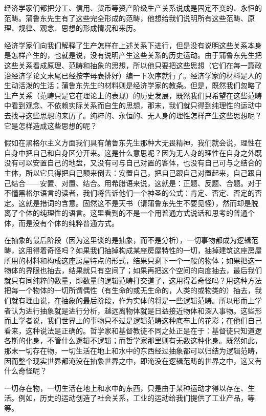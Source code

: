 \documentclass[a4paper,twoside,12pt]{ctexart}
\begin{document}
经济学家们都把分工、信用、货币等资产阶级生产关系说成是固定不变的、永恒的范畴。蒲鲁东先生有了这些完全形成的范畴，他想给我们说明所有这些范畴、原理、规律、观念、思想的形成情况和来历。

经济学家们向我们解释了生产怎样在上述关系下进行，但是没有说明这些关系本身是怎样产生的，也就是说，没有说明产生这些关系的历史运动。由于蒲鲁东先生把这些关系看成原理、范畴和抽象的思想，所以他只要把这些思想（它们在每一篇政治经济学论文末尾已经按字母表排好）编一下次序就行了。经济学家的材料是人的生动活泼的生活；蒲鲁东先生的材料则是经济学家的教条。但是，既然我们忽略了生产关系（范畴只是它在理论上的表现）的历史发展，既然我们只希望在这些范畴中看到观念、不依赖实际关系而自生的思想，那末，我们就只得到纯理性的运动中去找寻这些思想的来历了。纯粹的、永恒的、无人身的理性怎样产生这些思想呢？它是怎样造成这些思想的呢？

假如在黑格尔主义方面我们具有蒲鲁东先生那种大无畏精神，我们就会说，理性在自身中把自己和自身区分开来。这是什么意思呢？因为无人身的理性在自身之外既没有可以安置自己的地盘，又没有可与自己对置的客体，也没有自己可与之结合的主体，所以它只得把自己颠来倒去：安置自己，把自己跟自己对置起来，自己跟自己结合——安置、对置、结合。用希腊语来说，这就是：正题、反题、合题。对于不懂黑格尔语言的读者，我们将告诉他们一个神圣的公式：肯定、否定、否定的否定。这就是措词的含意。固然这不是天书（请蒲鲁东先生不要见怪），然而却是脱离了个体的纯理性的语言。这里看到的不是一个用普通方式说话和思考的普通个体，而是没有个体的纯粹普通方式。

在抽象的最后阶段（因为这里谈的是抽象，而不是分析），一切事物都成为逻辑范畴，这用得着奇怪吗？如果我们抽掉构成某座房屋特性的一切，抽掉建筑这座房屋所用的材料和构成这座房屋特点的形式，结果只剩下一个一般的物体；如果把这一物体的界限也抽去，结果就只有空间了；如果再把这个空间的向度抽去，最后我们就只有同纯粹的数量，即数量的逻辑范畴打交道了，这用得着奇怪吗？用这种方法把每一个物体的一切所谓偶性（有生命的或无生命的，人类的或物类的）抽去，我们就有理由说，在抽象的最后阶段，作为实体的将是一些逻辑范畴。所以形而上学者认为进行抽象就是进行分析，越远离物体就是日益接近物体和深入事物。这些形而上学者说，我们世界上的事物只不过是逻辑范畴这种底布上的花彩；在他们自己看来，这种说法是正确的。哲学家和基督教徒不同之处正是在于：基督徒只知道逻各斯的化身，不管什么逻辑不逻辑；而哲学家那里则有无数这种化身。既然如此，那末一切存在物，一切生活在地上和水中的东西经过抽象都可以归结为逻辑范畴，因而整个现实世界都淹没在抽象世界之中，即淹没在逻辑范畴的世界之中，这又有什么奇怪呢？

一切存在物，一切生活在地上和水中的东西，只是由于某种运动才得以存在、生活。例如，历史的运动创造了社会关系，工业的运动给我们提供了工业产品，等等。
\end{document}
